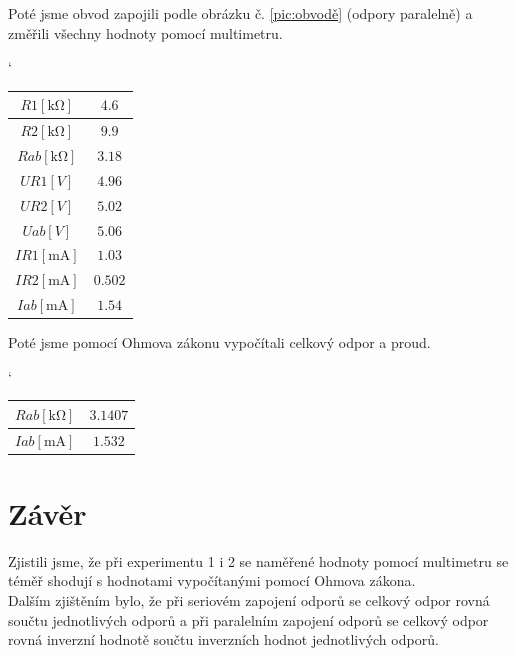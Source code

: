 \documentclass[11pt,a4paper,titlepage]{article}
\begin{document}
Poté jsme obvod zapojili podle obrázku č. \ref{pic:obvodě} (odpory paralelně) a změřili všechny hodnoty pomocí multimetru.

\begin{table}[h]
\begin{center}
\catcode`
\begin{tabular}{|c|c|} \hline
 $R1[\si{\kilo\ohm}]$ &$4.6$ \\ \hline
 $R2[\si{\kilo\ohm}]$ &$9.9$ \\ \hline
 $Rab[\si{\kilo\ohm}]$ &$3.18$ \\ \hline
 $UR1[V]$ &$4.96$ \\ \hline
 $UR2[V]$ &$5.02$ \\ \hline
 $Uab[V]$ &$5.06$ \\ \hline
 $IR1[\si{\milli\ampere}]$ &$1.03$ \\ \hline
 $IR2[\si{\milli\ampere}]$ &$0.502$ \\ \hline
 $Iab[\si{\milli\ampere}]$ &$1.54$ \\ \hline
\end{tabular}
\end{center}
\end{table}

Poté jsme pomocí Ohmova zákonu vypočítali celkový odpor a proud.

\begin{table}[h]
\begin{center}
\catcode`
\begin{tabular}{|c|c|} \hline
 $Rab[\si{\kilo\ohm}]$ &$3.1407$ \\ \hline
 $Iab[\si{\milli\ampere}]$ &$1.532$ \\ \hline
\end{tabular}
\end{center}
\end{table}



\section{Závěr}
Zjistili jsme, že při experimentu 1 i 2 se naměřené hodnoty pomocí multimetru se téměř shodují s hodnotami vypočítanými pomocí Ohmova zákona.
\\Dalším zjištěním bylo, že při seriovém zapojení odporů se celkový odpor rovná součtu jednotlivých odporů a při paralelním zapojení odporů se celkový odpor rovná inverzní hodnotě součtu inverzních hodnot jednotlivých odporů.
\end{document}
